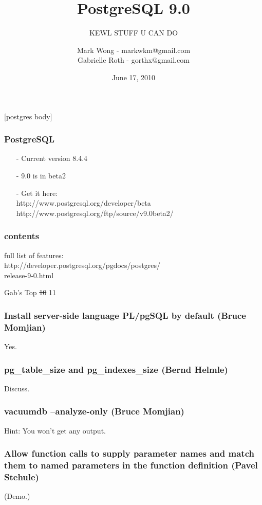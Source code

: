 \documentclass{beamer}
\title{PostgreSQL 9.0}
\subtitle{KEWL STUFF U CAN DO}
\author[markwkm gorthx]{Mark Wong - markwkm@gmail.com\\Gabrielle Roth - gorthx@gmail.com}
\institute{PDXPUG}
\date{June 17, 2010}
\begin{document}
\frame{\titlepage}

[postgres body]

\frame
{
  \frametitle{PostgreSQL}

  \begin{itemize}
  \item[-] Current version 8.4.4
  \item[-] 9.0 is in beta2
  \item[-] Get it here:\\
  http://www.postgresql.org/developer/beta\\
  http://www.postgresql.org/ftp/source/v9.0beta2/
  \end{itemize}
}

\frame
{
  \frametitle{contents}

  full list of features:\\
  http://developer.postgresql.org/pgdocs/postgres/\\
  release-9-0.html
}

\frame
{
  \begin{center}
  \huge{Gab's Top}
  \sout{10}
  \huge{11}
  \end{center}
}

\frame
{
  \frametitle{Install server-side language PL/pgSQL by default (Bruce Momjian)}
  \begin{center}
  Yes.
  \end{center}
}

\frame
{
  \frametitle{pg\_table\_size and pg\_indexes\_size (Bernd Helmle)}
  \begin{center}
  Discuss.
  \end{center}
}

\frame
{
  \frametitle{vacuumdb --analyze-only (Bruce Momjian)}
  \begin{center}
  Hint:  You won't get any output.
  \end{center}
}

\frame
{
  \frametitle{Allow function calls to supply parameter names and match them to named parameters in the function definition (Pavel Stehule)}

(Demo.)
}
\end{document}
